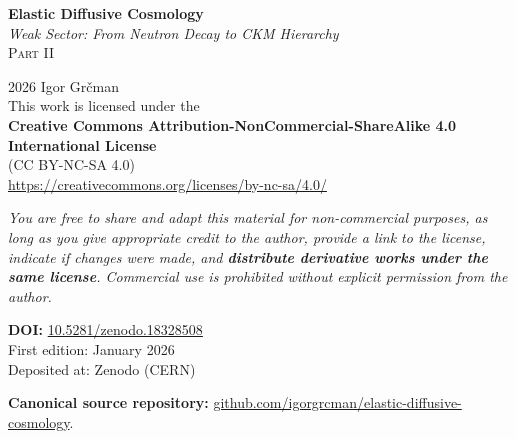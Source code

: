 
\thispagestyle{empty}
\vspace*{\fill}

\begin{center}

{\Large\textbf{Elastic Diffusive Cosmology}}\\[0.5ex]
{\large\textit{Weak Sector: From Neutron Decay to CKM Hierarchy}}\\[2ex]
{\textsc{Part II}}

\vspace{2cm}

{\small
\textcopyright{} 2026 Igor Gr\v{c}man\\[2ex]

This work is licensed under the\\[0.5ex]
\textbf{Creative Commons Attribution-NonCommercial-ShareAlike 4.0 International License}\\[0.5ex]
(CC BY-NC-SA 4.0)\\[1ex]
\href{https://creativecommons.org/licenses/by-nc-sa/4.0/}{https://creativecommons.org/licenses/by-nc-sa/4.0/}

\vspace{1.5cm}

\begin{minipage}{0.8\textwidth}
\centering
\small\textit{
You are free to share and adapt this material for non-commercial purposes, as long as you give appropriate credit to the author, provide a link to the license, indicate if changes were made, and \textbf{distribute derivative works under the same license}. Commercial use is prohibited without explicit permission from the author.
}
\end{minipage}

\vspace{1.5cm}

\textbf{DOI:} \href{https://doi.org/10.5281/zenodo.18328508}{10.5281/zenodo.18328508}\\[2ex]
First edition: January 2026\\[1ex]
Deposited at: Zenodo (CERN)

}

\end{center}

\vspace*{\fill}
\newpage

\noindent\textbf{Canonical source repository:} \href{https://github.com/igorgrcman/elastic-diffusive-cosmology}{github.com/igorgrcman/elastic-diffusive-cosmology}.

